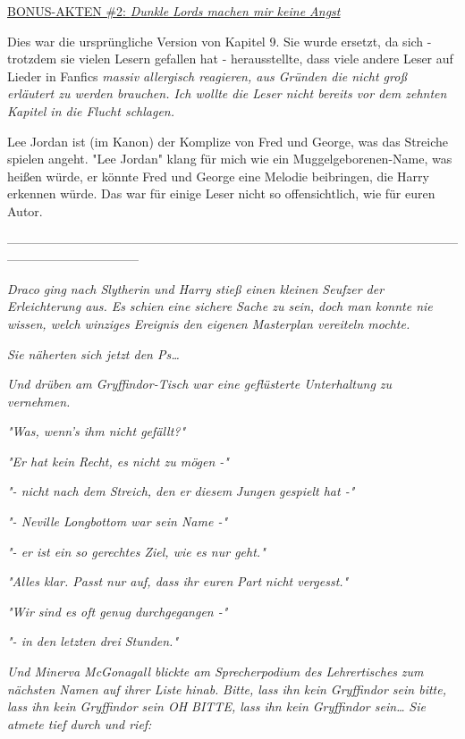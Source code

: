 {\uline{BONUS-AKTEN \#2: \emph{Dunkle Lords machen mir keine Angst}}

Dies war die ursprüngliche Version von Kapitel 9. Sie wurde ersetzt, da sich - trotzdem sie vielen Lesern gefallen hat - herausstellte, dass viele andere Leser auf Lieder in Fanfics \emph{massiv allergisch reagieren, aus Gründen die nicht groß erläutert zu werden brauchen. Ich wollte die Leser nicht bereits vor dem zehnten Kapitel in die Flucht schlagen.}

Lee Jordan ist (im Kanon) der Komplize von Fred und George, was das Streiche spielen angeht. "Lee Jordan" klang für mich wie ein Muggelgeborenen-Name, was heißen würde, er könnte Fred und George eine Melodie beibringen, die Harry erkennen würde. Das war für einige Leser nicht so offensichtlich, wie für euren Autor.

--------------------------------------------------------------------------------------------------------------------------------------------

\emph{Draco ging nach Slytherin und Harry stieß einen kleinen Seufzer der Erleichterung aus. Es} \emph{\emph{schien}} \emph{eine sichere Sache zu sein, doch man konnte nie wissen, welch winziges Ereignis den eigenen Masterplan vereiteln mochte.}

\emph{Sie näherten sich jetzt den Ps…}

\emph{Und drüben am Gryffindor-Tisch war eine geflüsterte Unterhaltung zu vernehmen.}

\emph{\emph{"Was, wenn's ihm nicht gefällt?"}}

\emph{\emph{"Er hat kein Recht, es nicht zu mögen -"}}

\emph{\emph{"- nicht nach dem Streich, den er}} \emph{\emph{d}\emph{iesem}} \emph{\emph{Jungen}} \emph{\emph{gespielt hat -"}}

\emph{\emph{"- Neville Longbottom war sein Name -"}}

\emph{\emph{"- er ist ein so gerechtes Ziel, wie es nur geht."}}

\emph{\emph{"Alles klar. Passt nur auf, dass ihr euren}} \emph{\emph{Part}} \emph{\emph{nicht vergesst."}}

\emph{\emph{"Wir sind es oft genug durchgegangen -"}}

\emph{\emph{"- in den letzten drei Stunden."}}

\emph{Und Minerva McGonagall blickte am Sprecherpodium des Lehrertisches} \emph{zum} \emph{nächsten Namen auf ihrer Liste} \emph{hinab.} \emph{\emph{Bitte, lass ihn kein Gryffindor sein bitte, lass ihn kein Gryffindor sein OH BITTE, lass ihn kein Gryffindor sein…}} \emph{Sie} \emph{atmete tief durch} \emph{und rief:}

}
